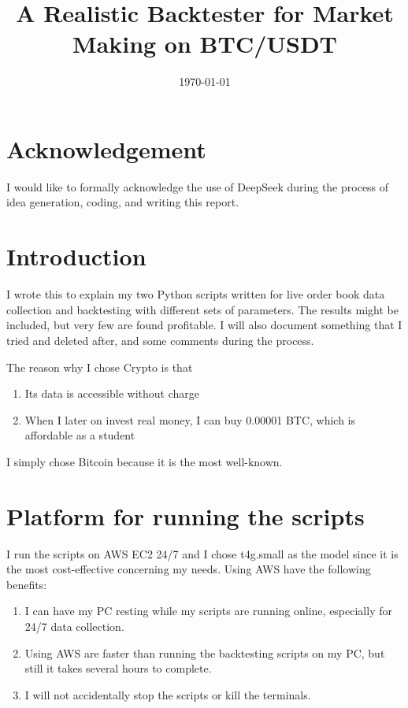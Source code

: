 \documentclass[11pt,a4paper]{article}
\begin{document}
\title{A Realistic Backtester for Market Making on BTC/USDT}
\date{\today}

\maketitle
\section{Acknowledgement}
I would like to formally acknowledge the use of DeepSeek during the process of idea generation, coding, and writing this report.


\section{Introduction}

I wrote this to  explain my two Python scripts written for live order book data collection and backtesting with different sets of parameters. The results might be included, but very few are found profitable. I will also document something that I tried and deleted after, and some comments during the process.

The reason why I chose Crypto is that
\begin{enumerate}
    \item Its data is accessible without charge
    \item When I later on invest real money, I can buy 0.00001 BTC, which is affordable as a student
\end{enumerate}
I simply chose Bitcoin because it is the most well-known.

\section{Platform for running the scripts}
I run the scripts on AWS EC2 24/7 and I chose t4g.small as the model since it is the most cost-effective concerning my needs. Using AWS have the following benefits:
\begin{enumerate}
    \item I can have my PC resting while my scripts are running online, especially for 24/7 data collection.
    \item Using AWS are faster than running the backtesting scripts on my PC, but still it takes several hours to complete.
    \item I will not accidentally stop the scripts or kill the terminals.
\end{enumerate}
\end{document}
